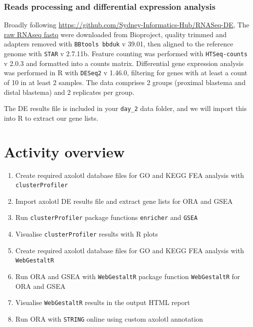 \documentclass[
]{book}
\providecommand{\tightlist}{%
  \setlength{\itemsep}{0pt}\setlength{\parskip}{0pt}}
\begin{document}
\hypertarget{reads-processing-and-differential-expression-analysis}{%
\subsubsection{Reads processing and differential expression analysis}\label{reads-processing-and-differential-expression-analysis}}

Broadly following \url{https://github.com/Sydney-Informatics-Hub/RNASeq-DE}, The \href{https://www.ncbi.nlm.nih.gov/bioproject/PRJNA300706}{raw RNAseq fastq} were downloaded from Bioproject, quality trimmed and adapters removed with \texttt{BBtools\ bbduk} v 39.01, then aligned to the reference genome with \texttt{STAR} v 2.7.11b. Feature counting was performed with \texttt{HTSeq-counts} v 2.0.3 and formatted into a counts matrix. Differential gene expression analysis was performed in R with \texttt{DESeq2} v 1.46.0, filtering for genes with at least a count of 10 in at least 2 samples. The data comprises 2 groups (proximal blastema and distal blastema) and 2 replicates per group.

The DE results file is included in your \texttt{day\_2} data folder, and we will import this into R to extract our gene lists.

\hypertarget{activity-overview-2}{%
\section{Activity overview}\label{activity-overview-2}}

\begin{enumerate}
\def\labelenumi{\arabic{enumi}.}
\tightlist
\item
  Create required axolotl database files for GO and KEGG FEA analysis with \texttt{clusterProfiler}
\item
  Import axolotl DE results file and extract gene lists for ORA and GSEA
\item
  Run \texttt{clusterProfiler} package functions \texttt{enricher} and \texttt{GSEA}
\item
  Visualise \texttt{clusterProfiler} results with R plots
\item
  Create required axolotl database files for GO and KEGG FEA analysis with \texttt{WebGestaltR}
\item
  Run ORA and GSEA with \texttt{WebGestaltR} package function \texttt{WebGestaltR} for ORA and GSEA
\item
  Visualise \texttt{WebGestaltR} results in the output HTML report
\item
  Run ORA with \texttt{STRING} online using custom axolotl annotation
\end{enumerate}
\end{document}
